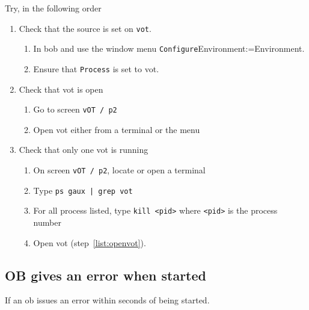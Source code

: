\documentclass[11pt,fleqn,a4paper]{book}
\makeatletter
\def\menu#1#2{\texttt{#1}\ifx{}#2\else\@for\@x:=#2\do{$\rightarrow$\texttt{\@x}}\fi}
\def\wmenu#1#2{window menu \menu{#1}{#2}}
\makeatother
\begin{document}
Try, in the following order
\begin{enumerate}
    \item Check that the source is set on \texttt{vot}.
        \begin{enumerate}
            \item In \gls{bob} and use the \wmenu{Configure}{Environment}.
            \item Ensure that \texttt{Process} is set to \gls{vot}.
        \end{enumerate}
    \item Check that \gls{vot} is open\label{list:openvot}
    \begin{enumerate}
        \item Go to screen \texttt{vOT / p2}
        \item Open \gls{vot} either from a terminal or the menu
    \end{enumerate}
    \item Check that only one \gls{vot} is running
    \begin{enumerate}
        \item On screen \texttt{vOT / p2}, locate or open a terminal
        \item Type \texttt{ps gaux | grep vot}
        \item For all process listed, type \texttt{kill <pid>} where \texttt{<pid>} is the process number
        \item Open \gls{vot} (step~\ref{list:openvot}).
    \end{enumerate}
\end{enumerate}

\subsection{OB gives an error when started}

If an \gls{ob} issues an error within seconds of being started.
\end{document}
